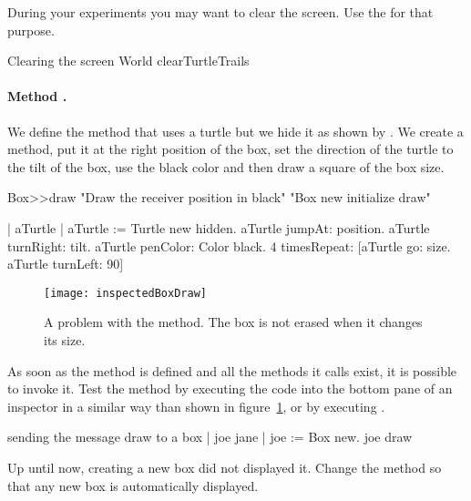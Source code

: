 During your experiments you may want to clear the
screen.  Use the 
for that purpose.

\begin{scriptwithtitle}{Clearing the screen}\label{scr:clearingScreen}
World clearTurtleTrails
\end{scriptwithtitle}

\paragraph{Method .} We define the method  that uses a
turtle but we hide it as shown by .  We create a
method, put it at the right position of the box, set the direction of
the turtle to the tilt of the box, use the black color and then draw a
square of the box size.

\begin{method}\label{mt:draw}
Box>>draw
   "Draw the receiver position in black"
   "Box new initialize draw"
	
   | aTurtle |
   aTurtle := Turtle new hidden.
   aTurtle jumpAt: position.
   aTurtle turnRight: tilt.
   aTurtle penColor: Color black.
   4 timesRepeat: [aTurtle go: size. 
                  aTurtle turnLeft: 90]
\end{method}


\begin{figure}
\begin{center}
\texttt{[image: inspectedBoxDraw]}
\caption{A problem with the  method. The box is not erased when it changes its size.\label{fig:drawingBox}}
\end{center}
\end{figure}

As soon as the method is defined and all the methods it calls exist, it is possible to invoke it.
Test the method by executing the code  into the bottom pane of an inspector in a similar way than shown in figure~\ref{fig:drawingBox}, or by executing .

\begin{scriptwithtitle}{sending the message draw to a box}\label{scr:draw}
| joe jane |
joe := Box new.
joe draw
\end{scriptwithtitle}




\begin{exercise}
Up until now, creating a new box did not displayed it.  Change the
method  so that any new box is automatically displayed.
\end{exercise}


